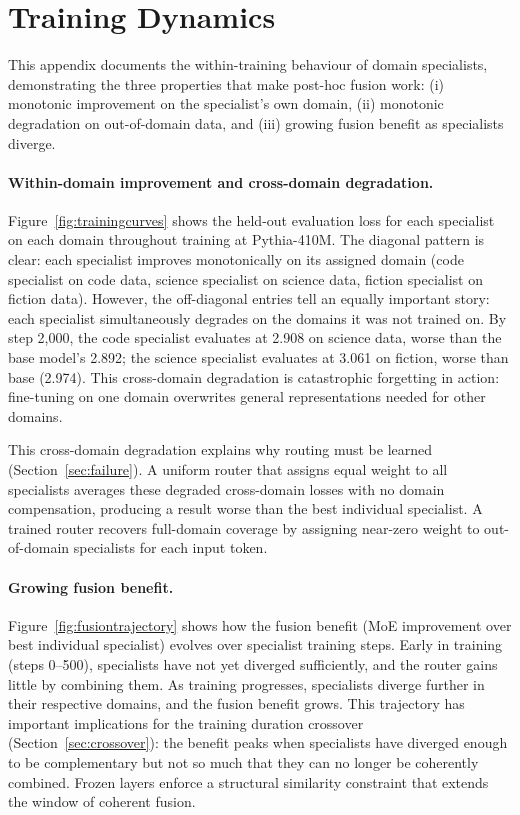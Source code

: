 \documentclass{article}
\begin{document}
\section{Training Dynamics}
\label{app:dynamics}

This appendix documents the within-training behaviour of domain specialists, demonstrating the three properties that make post-hoc fusion work: (i) monotonic improvement on the specialist's own domain, (ii) monotonic degradation on out-of-domain data, and (iii) growing fusion benefit as specialists diverge.

\paragraph{Within-domain improvement and cross-domain degradation.}
Figure~\ref{fig:trainingcurves} shows the held-out evaluation loss for each specialist on each domain throughout training at Pythia-410M. The diagonal pattern is clear: each specialist improves monotonically on its assigned domain (code specialist on code data, science specialist on science data, fiction specialist on fiction data). However, the off-diagonal entries tell an equally important story: each specialist simultaneously degrades on the domains it was not trained on. By step 2,000, the code specialist evaluates at 2.908 on science data, worse than the base model's 2.892; the science specialist evaluates at 3.061 on fiction, worse than base (2.974). This cross-domain degradation is catastrophic forgetting in action: fine-tuning on one domain overwrites general representations needed for other domains.

This cross-domain degradation explains why routing must be learned (Section~\ref{sec:failure}). A uniform router that assigns equal weight to all specialists averages these degraded cross-domain losses with no domain compensation, producing a result worse than the best individual specialist. A trained router recovers full-domain coverage by assigning near-zero weight to out-of-domain specialists for each input token.

\paragraph{Growing fusion benefit.}
Figure~\ref{fig:fusiontrajectory} shows how the fusion benefit (MoE improvement over best individual specialist) evolves over specialist training steps. Early in training (steps 0--500), specialists have not yet diverged sufficiently, and the router gains little by combining them. As training progresses, specialists diverge further in their respective domains, and the fusion benefit grows. This trajectory has important implications for the training duration crossover (Section~\ref{sec:crossover}): the benefit peaks when specialists have diverged enough to be complementary but not so much that they can no longer be coherently combined. Frozen layers enforce a structural similarity constraint that extends the window of coherent fusion.
\end{document}
